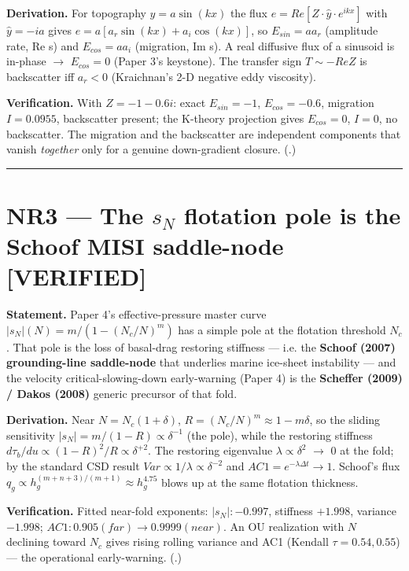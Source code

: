 \documentclass[11pt]{article}
\newcommand{\ctV}[1]{{\small\textbf{\textcolor{cVer}{[VERIFIED#1]}}}}
\begin{document}
\textbf{Derivation.} For topography $y=a \sin(kx)$ the flux $e=Re[Z\cdot \hat{y}\cdot e^{ikx}]$ with $\hat{y}=-ia$ gives $e = a[a_{r} \sin(kx) + a_{i} \cos(kx)]$, so $E_{sin} = a a_{r}$ (amplitude rate, Re s) and $E_{cos} = a a_{i}$ (migration, Im s). A real diffusive flux of a sinusoid is in-phase \ensuremath{\to} $E_{cos}=0$ (Paper 3's keystone). The transfer sign $T\sim -Re Z$ is backscatter iff $a_{r}<0$ (Kraichnan's 2-D negative eddy viscosity).


\textbf{Verification.} With $Z=-1-0.6i$: exact $E_{sin}=-1$, $E_{cos}=-0.6$, migration $I=0.0955$, backscatter present; the K-theory projection gives $E_{cos}=0$, $I=0$, no backscatter. The migration and the backscatter are independent components that vanish \emph{together} only for a genuine down-gradient closure. (.)


\medskip\hrule\medskip


\section*{NR3 — The $s_{N}$ flotation pole is the Schoof MISI saddle-node \ctV{}}


\textbf{Statement.} Paper 4's effective-pressure master curve $|s_{N}|(N)=m/(1-(N_{c}/N)^{m})$ has a simple pole at the flotation threshold $N_{c}$. That pole is the loss of basal-drag restoring stiffness — i.e. the \textbf{Schoof (2007) grounding-line saddle-node} that underlies marine ice-sheet instability — and the velocity critical-slowing-down early-warning (Paper 4) is the \textbf{Scheffer (2009) / Dakos (2008)} generic precursor of that fold.


\textbf{Derivation.} Near $N=N_{c}(1+\delta )$, $R=(N_{c}/N)^{m} \approx  1-m\delta $, so the sliding sensitivity $|s_{N}|=m/(1-R) \propto  \delta ^{-1}$ (the pole), while the restoring stiffness $d\tau _{b}/du \propto  (1-R)^{2}/R \propto  \delta ^{+2}$. The restoring eigenvalue $\lambda  \propto  \delta ^{2}$ \ensuremath{\to} 0 at the fold; by the standard CSD result $Var \propto  1/\lambda  \propto  \delta ^{-2}$ and $AC1 = e^{-\lambda \Delta t} \to  1$. Schoof's flux $q_{g} \propto  h_{g}^{(m+n+3)/(m+1)} \approx  h_{g}^{4.75}$ blows up at the same flotation thickness.


\textbf{Verification.} Fitted near-fold exponents: $|s_{N}|: -0.997$, stiffness $+1.998$, variance $-1.998$; $AC1: 0.905 (far) \to  0.9999 (near)$. An OU realization with $N$ declining toward $N_{c}$ gives rising rolling variance and AC1 (Kendall $\tau =0.54, 0.55$) — the operational early-warning. (.)
\end{document}
